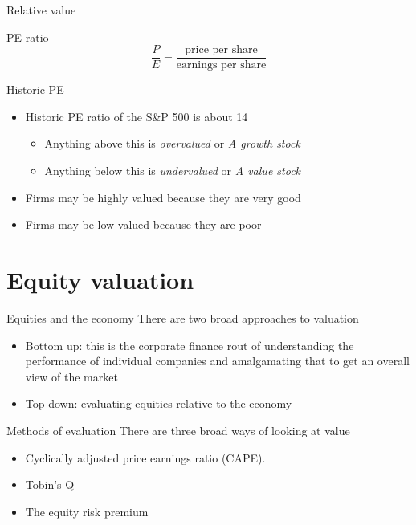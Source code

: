 \documentclass[14pt,xcolor=pdftex,dvipsnames,table]{beamer}\usepackage[]{graphicx}\usepackage[]{color}
\begin{document}
\begin{frame}{Relative value}
\begin{block}{PE ratio}
\begin{equation*}
\frac{P}{E} = \frac{\text{price per share}}{\text{earnings per share}}
\end{equation*}
\end{block}
\end{frame}

\begin{frame}{Historic PE}
\begin{itemize}[<+-| alert@+>]
\item Historic PE ratio of the S\&P 500 is about 14
\begin{itemize} 
\item Anything above this is \emph{overvalued} or \emph{A growth stock}
\item Anything below this is \emph{undervalued} or \emph{A value stock}
\end{itemize}
\item Firms may be highly valued because they are very good
\item Firms may be low valued because they are poor
\end{itemize}
\end{frame}


\section{Equity valuation}
\begin{frame}{Equities and the economy}
There are two broad approaches to valuation
\begin{itemize}[<+-| alert@+>]
\pause
\item Bottom up:  this is the corporate finance rout of understanding the performance of individual companies and amalgamating that to get an overall view of the market
\item Top down: evaluating equities relative to the economy
\end{itemize}
\end{frame}

\begin{frame}{Methods of evaluation}
There are three broad ways of looking at value
\pause
\begin{itemize}[<+-| alert@+>]
\item Cyclically adjusted price earnings ratio (CAPE). 
\item Tobin's Q
\item The equity risk premium
\end{itemize}
\end{frame}
\end{document}
